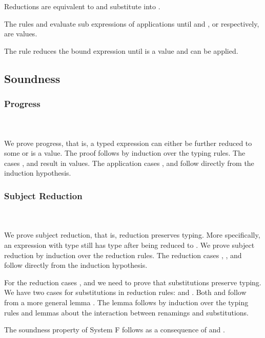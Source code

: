 \noindent Reductions  are equivalent to  and substitute  into . 

\noindent The rules  and  evaluate sub expressions of applications until  and , or  respectively, are values. 

\noindent The rule  reduces the bound expression  until  is a value and  can be applied. 

\subsection{Soundness}

\subsubsection{Progress}\hfill\\\\
We prove progress, that is, a typed expression  can either be further reduced to some  or  is a value. The proof follows by induction over the typing rules. 
\FProgress
The cases ,  and  result in values. 
The application cases ,  and  follow directly from the induction hypothesis. 
\subsubsection{Subject Reduction}\hfill\\\\
We prove subject reduction, that is, reduction preserves typing. More specifically, an expression  with type  still has type  after being reduced to . We prove subject reduction by induction over the reduction rules. 
\FSubjectReduction
The  reduction cases , ,  and  follow directly from the induction hypothesis. 

\noindent For the  reduction cases ,  and  we need to prove that substitutions preserve typing. We have two cases for substitutions in reduction rules:  \Data{[}  \Data{]} and  \Data{[}  \Data{]}.
Both  and  follow from a more general lemma . 
\Fpreserves
The lemma  follows by induction over the typing rules and lemmas about the interaction between renamings and substitutions. 

\noindent The soundness property of System F follows as a consequence of  and . 